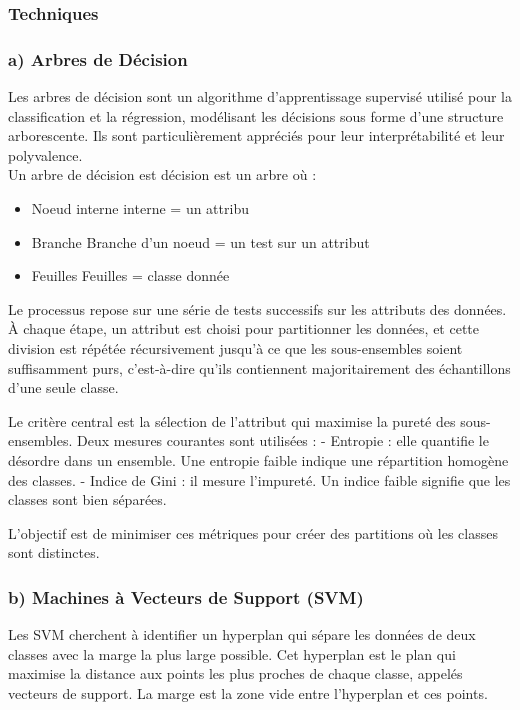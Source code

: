 \documentclass[a4paper,12pt]{report}
\begin{document}
        \subsubsection*{Techniques}

        \subsubsection*{a) Arbres de Décision}
        Les arbres de décision sont un algorithme d’apprentissage supervisé utilisé pour la classification et la régression, modélisant les décisions sous forme d’une structure arborescente. Ils sont particulièrement appréciés pour leur interprétabilité et leur polyvalence.\\

        Un arbre de décision est décision est un arbre où : 
        \begin{itemize}
            \item Noeud interne interne = un attribu
            \item Branche Branche d’un noeud = un test sur un attribut
            \item Feuilles Feuilles = classe donnée
        \end{itemize}

       Le processus repose sur une série de tests successifs sur les attributs des données. À chaque étape, un attribut est choisi pour partitionner les données, et cette division est répétée récursivement jusqu’à ce que les sous-ensembles soient suffisamment purs, c’est-à-dire qu’ils contiennent majoritairement des échantillons d’une seule classe.

Le critère central est la sélection de l’attribut qui maximise la pureté des sous-ensembles. Deux mesures courantes sont utilisées :
- Entropie : elle quantifie le désordre dans un ensemble. Une entropie faible indique une répartition homogène des classes.
- Indice de Gini : il mesure l’impureté. Un indice faible signifie que les classes sont bien séparées.

L’objectif est de minimiser ces métriques pour créer des partitions où les classes sont distinctes.

        \subsubsection*{b) Machines à Vecteurs de Support (SVM)}
        Les SVM cherchent à identifier un hyperplan qui sépare les données de deux classes avec la marge la plus large possible. Cet hyperplan est le plan qui maximise la distance aux points les plus proches de chaque classe, appelés vecteurs de support. La marge est la zone vide entre l’hyperplan et ces points.
\end{document}
